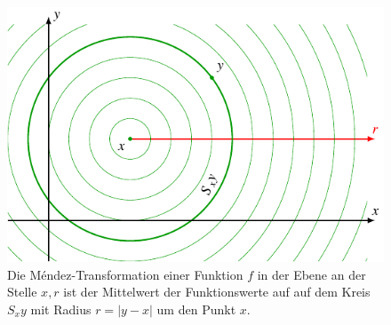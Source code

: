 %
%
%
\begin{figure}
\centering
\includegraphics{chapters/070-nichtkomm/images/2dmendez.pdf}
\caption{Die Méndez-Transformation einer Funktion $f$ in der
Ebene an der Stelle $x,r$ ist der Mittelwert der Funktionswerte
auf auf dem Kreis $S_xy$ mit Radius $r=|y-x|$ um den Punkt $x$.
\label{buch:nichtkomm:mendez:fig:2d}}
\end{figure}
